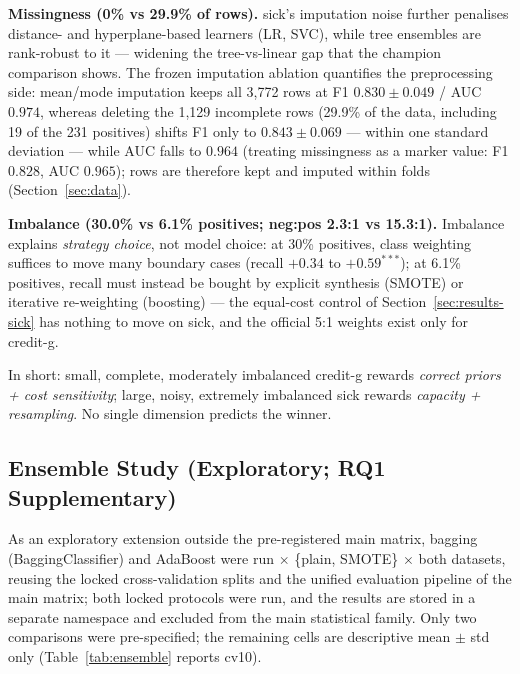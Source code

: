 \textbf{Missingness (0\% vs 29.9\% of rows).} sick's imputation noise further penalises distance- and hyperplane-based learners (LR, SVC), while tree ensembles are rank-robust to it --- widening the tree-vs-linear gap that the champion comparison shows. The frozen imputation ablation quantifies the preprocessing side: mean/mode imputation keeps all 3{,}772 rows at F1 $0.830\pm0.049$ / AUC $0.974$, whereas deleting the 1{,}129 incomplete rows (29.9\% of the data, including 19 of the 231 positives) shifts F1 only to $0.843\pm0.069$ --- within one standard deviation --- while AUC falls to $0.964$ (treating missingness as a marker value: F1 $0.828$, AUC $0.965$); rows are therefore kept and imputed within folds (Section~\ref{sec:data}).

\textbf{Imbalance (30.0\% vs 6.1\% positives; neg:pos 2.3:1 vs 15.3:1).} Imbalance explains \emph{strategy choice}, not model choice: at 30\% positives, class weighting suffices to move many boundary cases (recall $+0.34$ to $+0.59^{***}$); at 6.1\% positives, recall must instead be bought by explicit synthesis (SMOTE) or iterative re-weighting (boosting) --- the equal-cost control of Section~\ref{sec:results-sick} has nothing to move on sick, and the official 5:1 weights exist only for credit-g.

In short: small, complete, moderately imbalanced credit-g rewards \emph{correct priors + cost sensitivity}; large, noisy, extremely imbalanced sick rewards \emph{capacity + resampling}. No single dimension predicts the winner.

\subsection{Ensemble Study (Exploratory; RQ1 Supplementary)}
\label{sec:results-ensemble}

As an exploratory extension outside the pre-registered main matrix, bagging (BaggingClassifier) and AdaBoost were run $\times$ \{plain, SMOTE\} $\times$ both datasets, reusing the locked cross-validation splits and the unified evaluation pipeline of the main matrix; both locked protocols were run, and the results are stored in a separate namespace and excluded from the main statistical family. Only two comparisons were pre-specified; the remaining cells are descriptive mean $\pm$ std only (Table~\ref{tab:ensemble} reports cv10).

